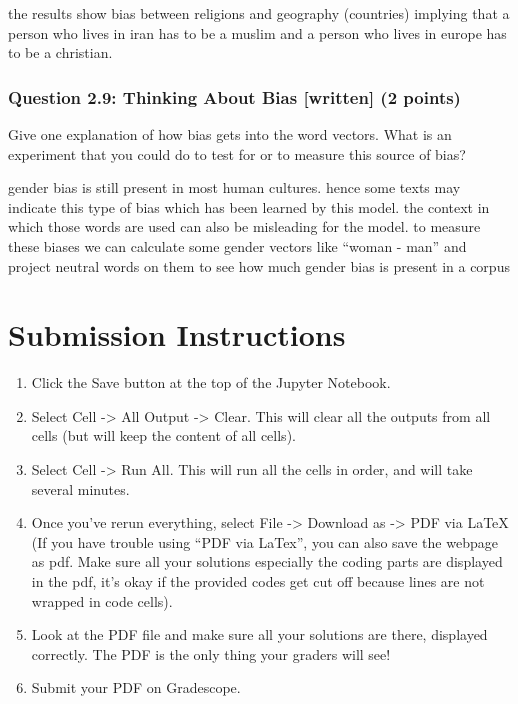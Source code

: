\documentclass[11pt]{article}
\providecommand{\tightlist}{%
      \setlength{\itemsep}{0pt}\setlength{\parskip}{0pt}}
\begin{document}
    the results show bias between religions and geography (countries)
implying that a person who lives in iran has to be a muslim and a person
who lives in europe has to be a christian.

    \hypertarget{question-2.9-thinking-about-bias-written-2-points}{%
\subsubsection{Question 2.9: Thinking About Bias {[}written{]} (2
points)}\label{question-2.9-thinking-about-bias-written-2-points}}

Give one explanation of how bias gets into the word vectors. What is an
experiment that you could do to test for or to measure this source of
bias?

    gender bias is still present in most human cultures. hence some texts
may indicate this type of bias which has been learned by this model. the
context in which those words are used can also be misleading for the
model. to measure these biases we can calculate some gender vectors like
``woman - man'' and project neutral words on them to see how much gender
bias is present in a corpus

    \hypertarget{submission-instructions}{%
\section{\texorpdfstring{ Submission
Instructions}{ Submission Instructions}}\label{submission-instructions}}

\begin{enumerate}
\def\labelenumi{\arabic{enumi}.}
\tightlist
\item
  Click the Save button at the top of the Jupyter Notebook.
\item
  Select Cell -\textgreater{} All Output -\textgreater{} Clear. This
  will clear all the outputs from all cells (but will keep the content
  of all cells).
\item
  Select Cell -\textgreater{} Run All. This will run all the cells in
  order, and will take several minutes.
\item
  Once you've rerun everything, select File -\textgreater{} Download as
  -\textgreater{} PDF via LaTeX (If you have trouble using ``PDF via
  LaTex'', you can also save the webpage as pdf. Make sure all your
  solutions especially the coding parts are displayed in the pdf, it's
  okay if the provided codes get cut off because lines are not wrapped
  in code cells).
\item
  Look at the PDF file and make sure all your solutions are there,
  displayed correctly. The PDF is the only thing your graders will see!
\item
  Submit your PDF on Gradescope.
\end{enumerate}


    
    
    
\end{document}
